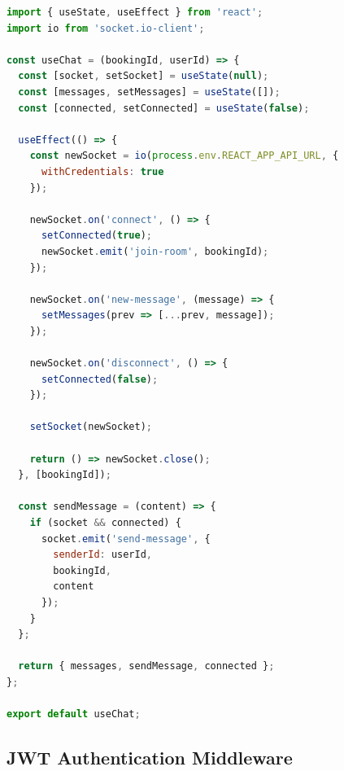 \documentclass[12pt,a4paper]{article}
\begin{document}
\begin{lstlisting}[language=JavaScript, caption=Custom React Hook for Chat]
import { useState, useEffect } from 'react';
import io from 'socket.io-client';

const useChat = (bookingId, userId) => {
  const [socket, setSocket] = useState(null);
  const [messages, setMessages] = useState([]);
  const [connected, setConnected] = useState(false);
  
  useEffect(() => {
    const newSocket = io(process.env.REACT_APP_API_URL, {
      withCredentials: true
    });
    
    newSocket.on('connect', () => {
      setConnected(true);
      newSocket.emit('join-room', bookingId);
    });
    
    newSocket.on('new-message', (message) => {
      setMessages(prev => [...prev, message]);
    });
    
    newSocket.on('disconnect', () => {
      setConnected(false);
    });
    
    setSocket(newSocket);
    
    return () => newSocket.close();
  }, [bookingId]);
  
  const sendMessage = (content) => {
    if (socket && connected) {
      socket.emit('send-message', {
        senderId: userId,
        bookingId,
        content
      });
    }
  };
  
  return { messages, sendMessage, connected };
};

export default useChat;
\end{lstlisting}

\subsection{JWT Authentication Middleware}
\end{document}
